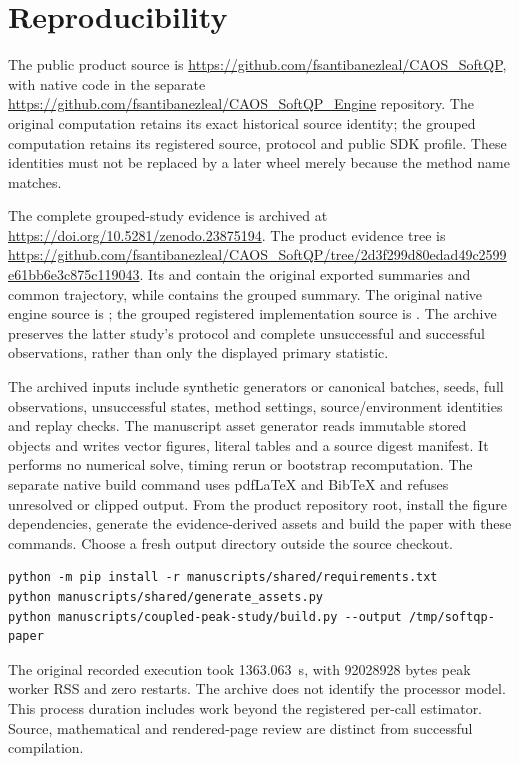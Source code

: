 \section{Reproducibility}\label{sec:reproducibility}
The public product source is
\url{https://github.com/fsantibanezleal/CAOS_SoftQP}, with native code
in the separate
\url{https://github.com/fsantibanezleal/CAOS_SoftQP_Engine} repository.
The original computation retains its exact historical source
identity; the grouped computation retains its registered source,
protocol and public SDK profile. These identities must not be
replaced by a later wheel merely because the method name matches.

The complete grouped-study evidence is archived at
\url{https://doi.org/10.5281/zenodo.23875194}. The product evidence tree is %
\url{https://github.com/fsantibanezleal/CAOS_SoftQP/tree/2d3f299d80edad49c2599e61bb6e3c875c119043}.
Its  and %
 contain the original exported
summaries and common trajectory, while
 contains
the grouped summary. The original native engine source is
; the grouped registered
implementation source is .
The archive preserves the latter study's protocol and complete unsuccessful
and successful observations, rather than only the displayed primary statistic.

The archived inputs include synthetic generators or canonical
batches, seeds, full observations, unsuccessful states, method
settings, source/environment identities and replay checks.
The manuscript asset generator reads immutable stored objects
and writes vector figures, literal tables and a source digest
manifest. It performs no numerical solve, timing rerun or
bootstrap recomputation. The separate native build command
uses pdfLaTeX and BibTeX and refuses unresolved or clipped output.
From the product repository root, install the figure dependencies,
generate the evidence-derived assets and build the paper with these
commands. Choose a fresh output directory outside the source checkout.
\begin{verbatim}
python -m pip install -r manuscripts/shared/requirements.txt
python manuscripts/shared/generate_assets.py
python manuscripts/coupled-peak-study/build.py --output /tmp/softqp-paper
\end{verbatim}
The original recorded execution took 1363.063~s, with 92028928 bytes
peak worker RSS and zero restarts. The archive does not identify the
processor model. This process duration includes work beyond the
registered per-call estimator. Source, mathematical and rendered-page
review are distinct from successful compilation.

